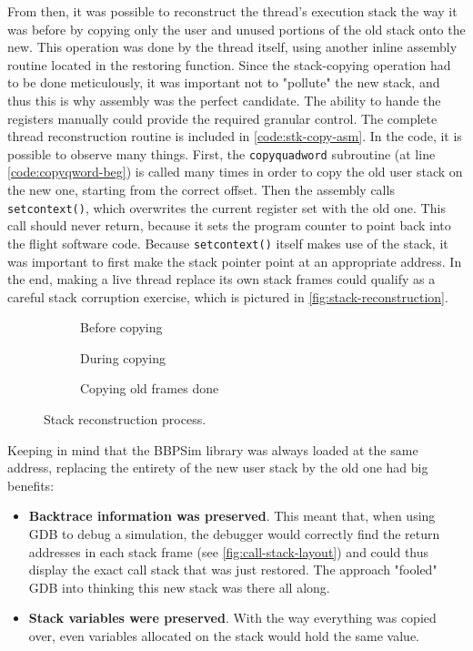 From then, it was possible to reconstruct the thread's execution stack the way it was before by copying only the user and unused portions of the old stack onto the new. This operation was done by the thread itself, using another inline assembly routine located in the restoring function. Since the stack-copying operation had to be done meticulously, it was important not to "pollute" the new stack, and thus this is why assembly was the perfect candidate. The ability to hande the registers manually could provide the required granular control. The complete thread reconstruction routine is included in \autoref{code:stk-copy-asm}. In the code, it is possible to observe many things. First, the \texttt{copyquadword} subroutine (at line \ref{code:copyqword-beg}) is called many times in order to copy the old user stack on the new one, starting from the correct offset. Then the assembly calls \texttt{setcontext()}, which overwrites the current register set with the old one. This call should never return, because it sets the program counter to point back into the flight software code. Because \texttt{setcontext()} itself makes use of the stack\cite{online:setcontext}, it was important to first make the stack pointer point at an appropriate address. In the end, making a live thread replace its own stack frames could qualify as a careful stack corruption exercise, which is pictured in \autoref{fig:stack-reconstruction}.

\begin{figure}[htbp]
	\centering
	\begin{subfigure}{.33\linewidth}
		\centering\small
		
		\caption{Before copying}
	\end{subfigure}%
	\begin{subfigure}{.33\linewidth}
		\centering\small
		
		\caption{During copying}
	\end{subfigure}%
	\begin{subfigure}{.33\linewidth}
		\centering\small
		
		\caption{Copying old frames done}
	\end{subfigure}
	\caption{Stack reconstruction process.}
	\label{fig:stack-reconstruction}
\end{figure}

Keeping in mind that the \gls{BBPSim} library was always loaded at the same address, replacing the entirety of the new user stack by the old one had big benefits:
\begin{itemize}
	\item \textbf{Backtrace information was preserved}. This meant that, when using GDB to debug a simulation, the debugger would correctly find the return addresses in each stack frame (see \autoref{fig:call-stack-layout}) and could thus display the exact call stack that was just restored. The approach "fooled" GDB into thinking this new stack was there all along.
	\item \textbf{Stack variables were preserved}. With the way everything was copied over, even variables allocated on the stack would hold the same value.
\end{itemize}

